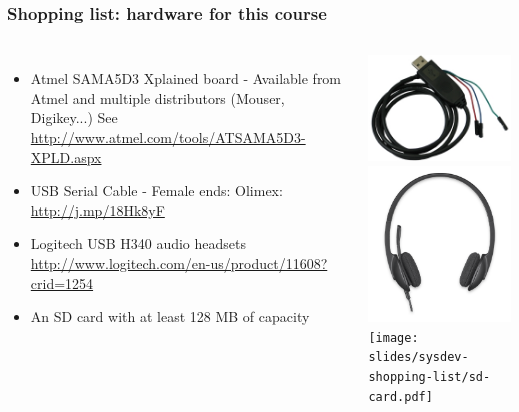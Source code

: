 \begin{frame}
\frametitle{Shopping list: hardware for this course}
  \begin{columns}
    \footnotesize
    \begin{itemize}
      \item Atmel SAMA5D3 Xplained board - Available from Atmel and
 	    multiple distributors (Mouser, Digikey...)
	    See \url{http://www.atmel.com/tools/ATSAMA5D3-XPLD.aspx}
      \item USB Serial Cable - Female ends:
	    Olimex: \url{http://j.mp/18Hk8yF} \\
      \item Logitech USB H340 audio headsets
	    \url{http://www.logitech.com/en-us/product/11608?crid=1254}
      \item An SD card with at least 128 MB of capacity
    \end{itemize}
    \includegraphics[height=0.20\textheight]{slides/sysdev-shopping-list/usb-serial-cable-female.png} \\
    \includegraphics[height=0.15\textheight]{slides/sysdev-shopping-list/logitech-h340.png} \\
    \texttt{[image: slides/sysdev-shopping-list/sd-card.pdf]}
  \end{columns}
\end{frame}
